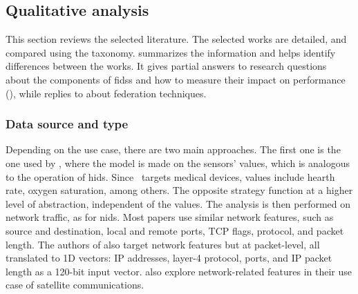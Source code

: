

\subsection{Qualitative analysis}
\label{sec:sota.quali}

This section reviews the selected literature.
The selected works are detailed, and compared using the taxonomy.
 summarizes the information and helps identify differences between the works.
It gives partial answers to research questions about the components of \glspl{fids} and how to measure their impact on performance (), while  replies to  about federation techniques.






\subsubsection{Data source and type}
\label{sec:sota.quali.data}

Depending on the use case, there are two main approaches.
The first one is the one used by \cite{zhang_BlockchainbasedFederatedLearning_2020,schneble_Attackdetectionusing_2019}, where the model is made on the sensors' values, which is analogous to the operation of \gls{hids}.
Since~\cite{zhang_BlockchainbasedFederatedLearning_2020} targets medical devices, values include hearth rate, oxygen saturation, among others.
The opposite strategy function at a higher level of abstraction, independent of the values.
The analysis is then performed on network traffic, as for \gls{nids}.
Most papers \cite{chen_Networkanomalydetection_2020,rathore_BlockSecIoTNetBlockchainbaseddecentralized_2019,nguyen_DIoTFederatedSelflearning_2019,li_DeepFedFederatedDeep_2020,rahman_InternetThingsIntrusion_2020,Sun2020,Popoola2021, chen_Networkanomalydetection_2020b,hei_trustedfeatureaggregator_2020} use similar network features, such as source and destination, local and remote ports, TCP flags, protocol, and packet length.
The authors of \cite{qin_LineSpeedScalableIntrusion_2020a} also target network features but at packet-level, all translated to 1D vectors: IP addresses, layer-4 protocol, ports, and IP packet length as a 120-bit input vector.
\textcite{li_DeepFedFederatedDeep_2020b} also explore network-related features in their use case of satellite communications.

